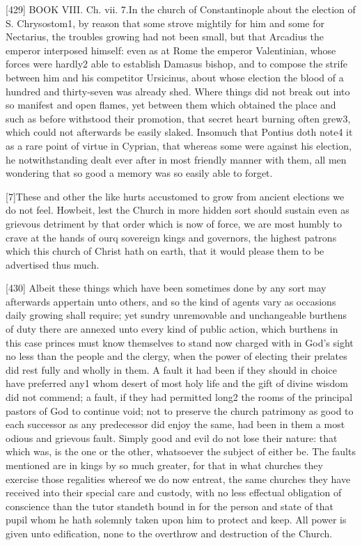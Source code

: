 [429]
BOOK VIII. Ch. vii. 7.In the church of Constantinople about the election of S. Chrysostom1, by reason that some strove mightily for him and some for Nectarius, the troubles growing had not been small, but that Arcadius the emperor interposed himself: even as at Rome the emperor Valentinian, whose forces were hardly2 able to establish Damasus bishop, and to compose the strife between him and his competitor Ursicinus, about whose election the blood of a hundred and thirty-seven was already shed. Where things did not break out into so manifest and open flames, yet between them which obtained the place and such as before withstood their promotion, that secret heart burning often grew3, which could not afterwards be easily slaked. Insomuch that Pontius doth note4 it as a rare point of virtue in Cyprian, that whereas some were against his election, he notwithstanding dealt ever after in most friendly manner with them, all men wondering that so good a memory was so easily able to forget.

[7]These and other the like hurts accustomed to grow from ancient elections we do not feel. Howbeit, lest the Church in more hidden sort should sustain even as grievous detriment by that order which is now of force, we are most humbly to crave at the hands of ourq sovereign kings and governors, the highest patrons which this church of Christ hath on earth, that it would please them to be advertised thus much.

[430]
Albeit these things which have been sometimes done by any sort may afterwards appertain unto others, and so the kind of agents vary as occasions daily growing shall require; yet sundry unremovable and unchangeable burthens of duty there are annexed unto every kind of public action, which burthens in this case princes must know themselves to stand now charged with in God’s sight no less than the people and the clergy, when the power of electing their prelates did rest fully and wholly in them. A fault it had been if they should in choice have preferred any1 whom desert of most holy life and the gift of divine wisdom did not commend; a fault, if they had permitted long2 the rooms of the principal pastors of God to continue void; not to preserve the church patrimony as good to each successor as any predecessor did enjoy the same, had been in them a most odious and grievous fault. Simply good and evil do not lose their nature: that which was, is the one or the other, whatsoever the subject of either be. The faults mentioned are in kings by so much greater, for that in what churches they exercise those regalities whereof we do now entreat, the same churches they have received into their special care and custody, with no less effectual obligation of conscience than the tutor standeth bound in for the person and state of that pupil whom he hath solemnly taken upon him to protect and keep. All power is given unto edification, none to the overthrow and destruction of the Church.

